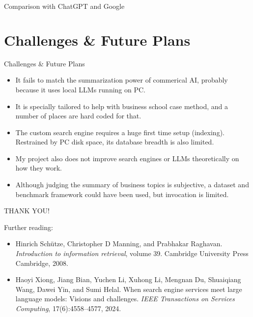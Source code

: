 \documentclass{beamer}
\begin{document}
\begin{frame}{Comparison with ChatGPT and Google}
\begin{center}
\end{center}
\end{frame}

\section*{Challenges \& Future Plans}
\begin{frame}{Challenges \& Future Plans}
  \begin{itemize}
  \item
	  It fails to match the summarization power of commerical AI, probably
	  because it uses local LLMs running on PC.
  \item
	  It is specially tailored to help with business school case method, and a
	  number of places are hard coded for that.
  \item 
	  The custom search engine requires a huge first time setup (indexing).
	  Restrained by PC disk space, its database breadth is also limited.
  \item 
	  My project also does not improve search engines or LLMs theoretically on
	  how they work.
  \item
	  Although judging the summary of business topics is subjective, a dataset
	  and benchmark framework could have been used, but invocation is limited.
  \end{itemize}
\end{frame}

\begin{frame}
	\begin{center}
	{\large THANK YOU!}
	\end{center}

	Further reading:
	\begin{itemize}
		\item Hinrich Sch\"utze, Christopher D Manning, and Prabhakar Raghavan.
			\emph{Introduction to information retrieval}, volume 39.
			Cambridge University Press Cambridge, 2008.
		\item Haoyi Xiong, Jiang Bian, Yuchen Li, Xuhong Li, Mengnan Du,
			Shuaiqiang Wang, Dawei Yin, and Sumi Helal. When search engine
			services meet large language models: Visions and challenges.
			\emph{IEEE Transactions on Services Computing}, 17(6):4558--4577,
			2024.
	\end{itemize}
\end{frame}
\end{document}
